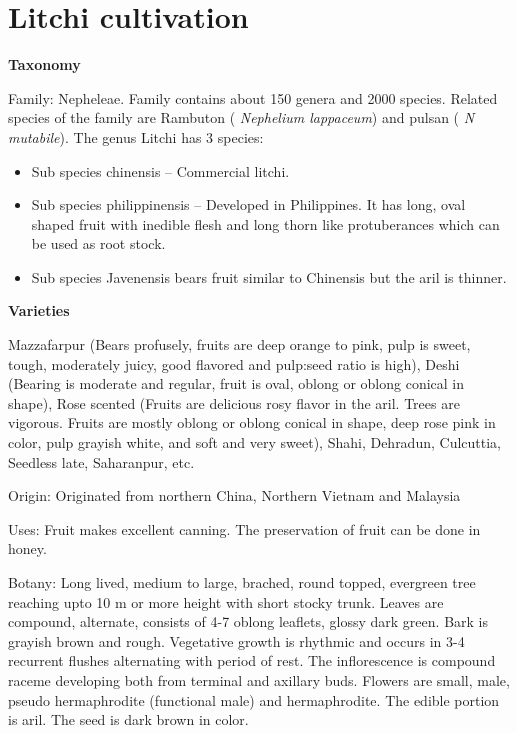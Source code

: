 \documentclass[
  openany]{book}
\providecommand{\tightlist}{%
  \setlength{\itemsep}{0pt}\setlength{\parskip}{0pt}}
\begin{document}
\hypertarget{litchi-cultivation}{%
\section{Litchi cultivation}\label{litchi-cultivation}}

\textbf{Taxonomy}

Family: Nepheleae. Family contains about 150 genera and 2000 species. Related species of the family are Rambuton ( \emph{Nephelium lappaceum}) and pulsan ( \emph{N mutabile}). The genus Litchi has 3 species:

\begin{itemize}
\tightlist
\item
  Sub species chinensis -- Commercial litchi.
\item
  Sub species philippinensis -- Developed in Philippines. It has long, oval shaped fruit with inedible flesh and long thorn like protuberances which can be used as root stock.
\item
  Sub species Javenensis bears fruit similar to Chinensis but the aril is thinner.
\end{itemize}

\textbf{Varieties}

Mazzafarpur (Bears profusely, fruits are deep orange to pink, pulp is sweet, tough, moderately juicy, good flavored and pulp:seed ratio is high), Deshi (Bearing is moderate and regular, fruit is oval, oblong or oblong conical in shape), Rose scented (Fruits are delicious rosy flavor in the aril. Trees are vigorous. Fruits are mostly oblong or oblong conical in shape, deep rose pink in color, pulp grayish white, and soft and very sweet), Shahi, Dehradun, Culcuttia, Seedless late, Saharanpur, etc.

Origin: Originated from northern China, Northern Vietnam and Malaysia

Uses: Fruit makes excellent canning. The preservation of fruit can be done in honey.

Botany: Long lived, medium to large, brached, round topped, evergreen tree reaching upto 10 m or more height with short stocky trunk. Leaves are compound, alternate, consists of 4-7 oblong leaflets, glossy dark green. Bark is grayish brown and rough. Vegetative growth is rhythmic and occurs in 3-4 recurrent flushes alternating with period of rest. The inflorescence is compound raceme developing both from terminal and axillary buds. Flowers are small, male, pseudo hermaphrodite (functional male) and hermaphrodite. The edible portion is aril. The seed is dark brown in color.
\end{document}
